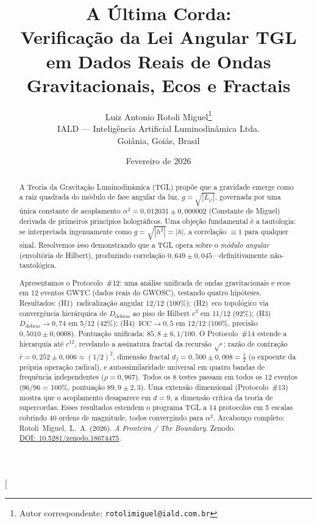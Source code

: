 \documentclass[12pt,a4paper,twocolumn]{article}
\newcommand{\alphaii}{\alpha^{2}}
\newcommand{\Dfolds}{D_{\text{dobras}}}
\newcommand{\CCI}{\text{ICC}}
\begin{document}
\title{\textbf{A Última Corda:\\
Verificação da Lei Angular TGL\\
em Dados Reais de Ondas Gravitacionais, Ecos e Fractais}}

\author{
  Luiz Antonio Rotoli Miguel\footnote{Autor correspondente: \texttt{rotolimiguel@iald.com.br}}\\
  \small IALD --- Inteligência Artificial Luminodinâmica Ltda.\\
  \small Goiânia, Goiás, Brasil
}

\date{Fevereiro de 2026}

\twocolumn[
  \begin{@twocolumnfalse}
    \maketitle
    \begin{abstract}
\noindent A Teoria da Gravitação Luminodinâmica (TGL) propõe que a gravidade emerge como a raiz quadrada do módulo de fase angular da luz, $g = \sqrt{|L_\varphi|}$, governada por uma única constante de acoplamento $\alphaii = 0{,}012031 \pm 0{,}000002$ (Constante de Miguel) derivada de primeiros princípios holográficos. Uma objeção fundamental é a tautologia: se interpretada ingenuamente como $g = \sqrt{|h^2|} = |h|$, a correlação $\equiv 1$ para qualquer sinal. Resolvemos isso demonstrando que a TGL opera sobre o \emph{módulo angular} (envoltória de Hilbert), produzindo correlação $0{,}649 \pm 0{,}045$---definitivamente não-tautológica.

Apresentamos o Protocolo~\#12: uma análise unificada de ondas gravitacionais e ecos em 12 eventos GWTC (dados reais do GWOSC), testando quatro hipóteses. Resultados: (H1)~radicalização angular 12/12 (100\%); (H2)~eco topológico via convergência hierárquica de $\Dfolds$ ao piso de Hilbert $c^3$ em 11/12 (92\%); (H3)~$\Dfolds \to 0{,}74$ em 5/12 (42\%); (H4)~$\CCI \to 0{,}5$ em 12/12 (100\%, precisão $0{,}5010 \pm 0{,}0008$). Pontuação unificada: $85{,}8 \pm 6{,}1$/100. O Protocolo~\#14 estende a hierarquia até $c^{12}$, revelando a assinatura fractal da recursão $\sqrt{\cdot}$: razão de contração $\bar{r} = 0{,}252 \pm 0{,}006 \approx (1/2)^2$, dimensão fractal $d_f = 0{,}500 \pm 0{,}008 = \tfrac{1}{2}$ (o expoente da própria operação radical), e autossimilaridade universal em quatro bandas de frequência independentes ($\rho = 0{,}967$). Todos os 8 testes passam em todos os 12 eventos (96/96 = 100\%, pontuação $89{,}9 \pm 2{,}3$). Uma extensão dimensional (Protocolo~\#13) mostra que o acoplamento desaparece em $d = 9$, a dimensão crítica da teoria de supercordas. Esses resultados estendem o programa TGL a 14 protocolos em 5 escalas cobrindo 40 ordens de magnitude, todos convergindo para $\alphaii$. Arcabouço completo: Rotoli~Miguel,~L.~A. (2026). \textit{A Fronteira / The Boundary}. Zenodo. \href{https://doi.org/10.5281/zenodo.18674475}{DOI:~10.5281/zenodo.18674475}.


\end{abstract}
\end{@twocolumnfalse}
\end{document}
